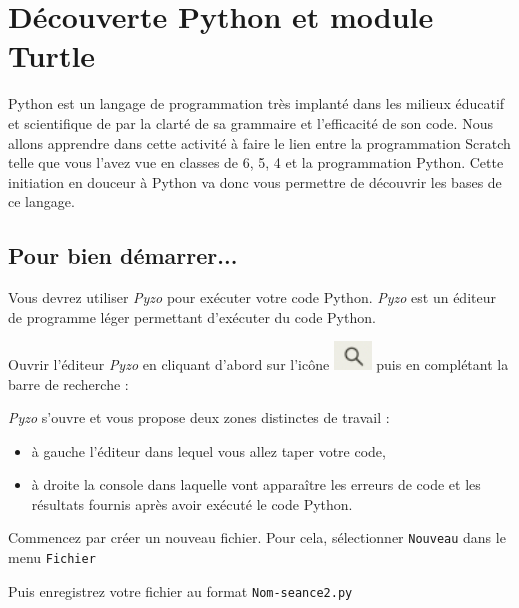 \chapter{Découverte Python et module Turtle}

Python est un langage de programmation très implanté dans les milieux éducatif et scientifique de par la clarté de sa grammaire et l'efficacité de son code. Nous allons apprendre dans cette activité à faire le lien entre la programmation Scratch telle que vous l'avez vue en classes de 6, 5, 4 et la programmation Python. Cette initiation en douceur à Python va donc vous permettre de découvrir les bases de ce langage. 

\section{Pour bien démarrer...}

Vous devrez utiliser \emph{Pyzo} pour exécuter votre code Python. \emph{Pyzo} est un éditeur de programme léger permettant d'exécuter du code Python. 

Ouvrir l'éditeur \emph{Pyzo} en cliquant d'abord sur l'icône \includegraphics[width=1cm]{./images/activite7/icone_recherche} puis en complétant la barre de recherche : 


\emph{Pyzo} s'ouvre et vous propose deux zones distinctes de travail :
\begin{itemize}
\item à gauche l'éditeur dans lequel vous allez taper votre code,
\item à droite la console dans laquelle vont apparaître les erreurs de code et les résultats fournis après avoir exécuté le code Python.
\end{itemize}


Commencez par créer un nouveau fichier. Pour cela, sélectionner \texttt{Nouveau} dans le menu \texttt{Fichier}


Puis enregistrez votre fichier au format \texttt{Nom-seance2.py}

